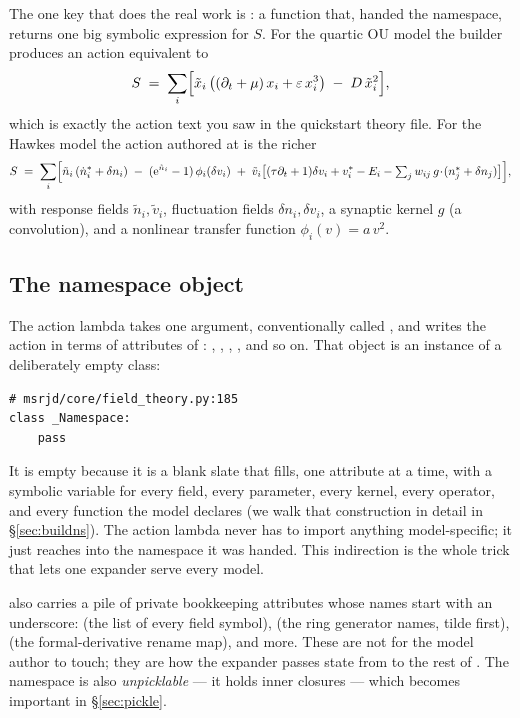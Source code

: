 The one key that does the real work is : a function that, handed the
namespace, returns one big symbolic expression for $S$. For the quartic OU model
the builder produces an action equivalent to
\[
  S \;=\; \sum_{i}\Bigl[\tilde x_i\,\bigl((\partial_t + \mu)\,x_i + \varepsilon\,x_i^{3}\bigr)
          \;-\; D\,\tilde x_i^{2}\Bigr],
\]
which is exactly the action text 
you saw in the quickstart theory file. For the Hawkes model the action authored at
 is the richer
\[
  S \;=\; \sum_i\Bigl[\tilde n_i\,(\dot{n}^{*}_i + \delta n_i)
        \;-\;(\mathrm{e}^{\tilde n_i}-1)\,\phi_i(\delta v_i)
        \;+\;\tilde v_i\bigl[(\tau\partial_t+1)\delta v_i + v^{*}_i - E_i
              - \textstyle\sum_j w_{ij}\,g\!\cdot\!(n^{*}_j+\delta n_j)\bigr]\Bigr],
\]
with response fields $\tilde n_i,\tilde v_i$, fluctuation fields
$\delta n_i,\delta v_i$, a synaptic kernel $g$ (a convolution), and a nonlinear
transfer function $\phi_i(v)=a\,v^2$.

\subsection{The namespace object}

The action lambda takes one argument, conventionally called , and writes
the action in terms of attributes of : , ,
, , and so on. That  object is an instance of a
deliberately empty class:

\begin{lstlisting}
# msrjd/core/field_theory.py:185
class _Namespace:
    pass
\end{lstlisting}

It is empty because it is a blank slate that 
fills, one attribute at a time, with a symbolic variable for every field, every
parameter, every kernel, every operator, and every function the model declares
(we walk that construction in detail in \S\ref{sec:buildns}). The action lambda
never has to import anything model-specific; it just reaches into the namespace it
was handed. This indirection is the whole trick that lets one expander serve every
model.

\begin{gotcha}
 also carries a pile of private bookkeeping attributes whose
names start with an underscore:  (the list of every
field symbol),  (the ring generator names, tilde
first),  (the formal-derivative rename map), and
more. These are not for the model author to touch; they are how the expander
passes state from  to the rest of . The
namespace is also \emph{unpicklable} --- it holds inner closures --- which becomes
important in \S\ref{sec:pickle}.
\end{gotcha}

